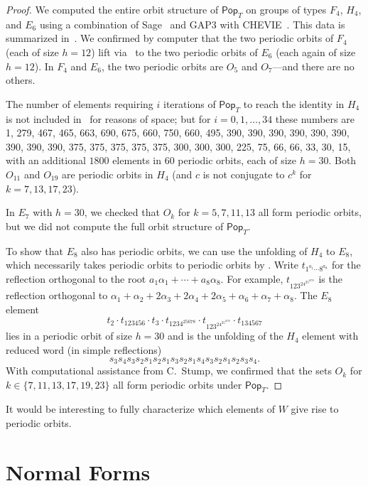 \documentclass[ALCO,ThmDefs,Unicode,epreuves]{cedram}
\newcommand{\pop}{\mathsf{Pop}}
\begin{document}
\begin{proof}
We computed the entire orbit structure of $\pop_T$ on groups of types $F_4$, $H_4$, and $E_6$ using a combination of Sage~\cite{sagemath} and GAP3 with CHEVIE~\cite{Sch97,GH96}.  This data is summarized in~.  We confirmed by computer that the two periodic orbits of $F_4$ (each of size $h=12$) lift via~ to the two periodic orbits of $E_6$ (each again of size $h=12$).  In $F_4$ and $E_6$, the two periodic orbits are $O_5$ and $O_7$---and there are no others.

The number of elements requiring $i$ iterations of $\pop_T$ to reach the identity in $H_4$ is not included in~ for reasons of space; but for $i=0,1,\ldots,34$ these numbers are 1, 279, 467, 465, 663, 690, 675, 660, 750, 660, 495, 390, 390, 390, 390, 390, 390, 390, 390, 390, 375, 375, 375, 375, 375, 300, 300, 300, 225, 75, 66, 66, 33, 30, 15, with an additional $1800$ elements in 60 periodic orbits, each of size $h=30$.  Both $O_{11}$ and $O_{19}$ are periodic orbits in $H_4$ (and $c$ is not conjugate to $c^k$ for $k=7,13,17,23$).


In $E_7$ with $h=30$, we checked that $O_k$ for $k=5,7,11,13$ all form periodic orbits, but we did not compute the full orbit structure of $\pop_T$.


To show that $E_8$ also has periodic orbits, we can use the unfolding of $H_4$ to $E_8$, which necessarily takes periodic orbits to periodic orbits by .  Write $t_{1^{a_1}\cdots 8^{a_8}}$ for the reflection orthogonal to the root $a_1\alpha_1+\cdots+a_8\alpha_8$. For example, $t_{123^24^25^2678}$ is the reflection orthogonal to $\alpha_{1} + \alpha_{2} + 2\alpha_{3} + 2\alpha_{4} + 2\alpha_{5} + \alpha_{6} + \alpha_{7} + \alpha_{8}$. The $E_8$ element 
\[
t_2 \cdot t_{123456} \cdot t_3 \cdot t_{1234^25678} \cdot t_{123^24^25^2678} \cdot t_{134567}
\]
 lies in a periodic orbit of size $h=30$ and is the unfolding of the $H_4$ element with reduced word (in simple reflections) 
\[
s_3s_4s_3s_2s_1s_2s_1s_3s_2s_1s_4s_3s_2s_1s_2s_3s_4.
\]
With computational assistance from C.~Stump, we confirmed that the sets $O_k$ for $k \in \{7,11,13,17,19,23\}$ all form periodic orbits under $\pop_T$.
\end{proof}  

It would be interesting to fully characterize which elements of $W$ give rise to periodic orbits.


\section{Normal Forms}
\end{document}
